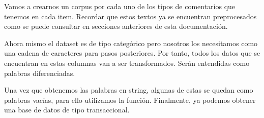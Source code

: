 \documentclass[spanish,]{article}
\newenvironment{Shaded}{\begin{snugshade}}{\end{snugshade}}
\newcommand{\KeywordTok}[1]{\textcolor[rgb]{0.13,0.29,0.53}{\textbf{#1}}}
\newcommand{\StringTok}[1]{\textcolor[rgb]{0.31,0.60,0.02}{#1}}
\newcommand{\CommentTok}[1]{\textcolor[rgb]{0.56,0.35,0.01}{\textit{#1}}}
\newcommand{\ControlFlowTok}[1]{\textcolor[rgb]{0.13,0.29,0.53}{\textbf{#1}}}
\newcommand{\OperatorTok}[1]{\textcolor[rgb]{0.81,0.36,0.00}{\textbf{#1}}}
\newcommand{\NormalTok}[1]{#1}
\begin{document}
Vamos a crearnos un corpus por cada uno de los tipos de comentarios que
tenemos en cada item. Recordar que estos textos ya se encuentran
preprocesados como se puede consultar en secciones anteriores de esta
documentación.

\begin{Shaded}
\end{Shaded}

Ahora mismo el dataset es de tipo categórico pero nosotros los
necesitamos como una cadena de caracteres para pasos posteriores. Por
tanto, todos los datos que se encuentran en estas columnas van a ser
transformados. Serán entendidas como palabras diferenciadas.

Una vez que obtenemos las palabras en string, algunas de estas se quedan
como palabras vacías, para ello utilizamos la función. Finalmente, ya
podemos obtener una base de datos de tipo transaccional.

\begin{Shaded}
\end{Shaded}
\end{document}
